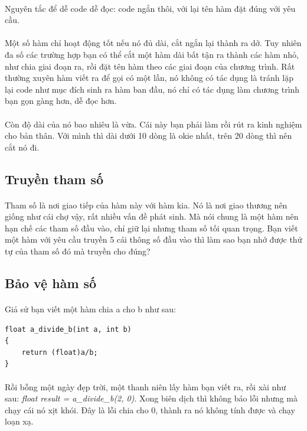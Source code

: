 \documentclass[12pt,a5paper]{book}
\begin{document}
\paragraph{}
Nguyên tắc để dễ code dễ đọc: code ngắn thôi, với lại tên hàm đặt đúng với yêu cầu. 
\paragraph{}
Một số hàm chỉ hoạt động tốt nếu nó đủ dài, cắt ngắn lại thành ra dở. Tuy nhiên đa số các trường hợp bạn có thể cắt một hàm dài bất tận ra thành các hàm nhỏ, như chia giai đoạn ra, rồi đặt tên hàm theo các giai đoạn của chương trình. Rất thường xuyên hàm viết ra để gọi có một lần, nó không có tác dụng là tránh lặp lại code như mục đích sinh ra hàm ban đầu, nó chỉ có tác dụng làm chương trình bạn gọn gàng hơn, dễ đọc hơn.
\paragraph{}
Còn độ dài của nó bao nhiêu là vừa. Cái này bạn phải làm rồi rút ra kinh nghiệm cho bản thân. Với mình thì dài dưới 10 dòng là okie nhất, trên 20 dòng thì nên cắt nó đi.
\subsection{Truyền tham số}
\paragraph{}
Tham số là nơi giao tiếp của hàm này với hàm kia. Nó là nơi giao thương nên giống như cái chợ vậy, rất nhiều vấn đề phát sinh. Mà nói chung là một hàm nên hạn chế các tham số đầu vào, chỉ giữ lại nhưng tham số tối quan trọng. Bạn viết một hàm với yêu cầu truyền 5 cái thông số đầu vào thì làm sao bạn nhớ được thứ tự của tham số đó mà truyền cho đúng?
\subsection{Bảo vệ hàm số}
\paragraph{}
Giả sử bạn viết một hàm chia a cho b như sau:
\begin{lstlisting}
float a_divide_b(int a, int b)
{
	return (float)a/b;
}
\end{lstlisting}

\paragraph{}
Rồi bỗng một ngày đẹp trời, một thanh niên lấy hàm bạn viết ra, rồi xài như sau: \textit{float result = a\_divide\_b(2, 0)}. Xong biên dịch thì không báo lỗi nhưng mà chạy cái nó xịt khói. Đây là lỗi chia cho 0, thành ra nó không tính được và chạy loạn xạ.
\end{document}
